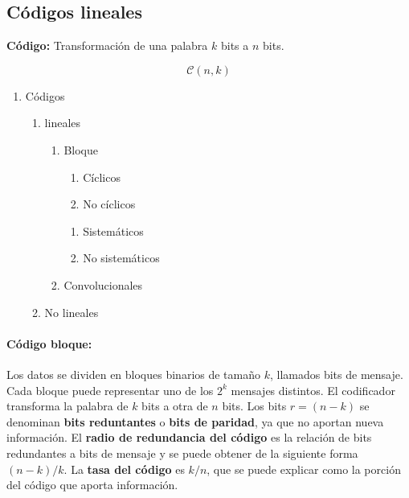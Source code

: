 \documentclass{article}
\begin{document}
\pagebreak
\subsection{Códigos lineales}

\textbf{Código:} Transformación de una palabra $k$ bits a $n$ bits.

\begin{equation}
    \mathcal{C}(n,k)
\end{equation}

\begin{enumerate}
    \item Códigos
    \begin{enumerate}
        \item lineales
        \begin{enumerate}
            \item Bloque
            \begin{enumerate}
                \item Cíclicos
                \item No cíclicos
            \end{enumerate}
            \begin{enumerate}
                \item Sistemáticos
                \item No sistemáticos
            \end{enumerate}
            \item Convolucionales
        \end{enumerate}
        \item No lineales
    \end{enumerate}
\end{enumerate}

\paragraph{Código bloque:} Los datos se dividen en bloques binarios de tamaño $k$, llamados bits de mensaje. Cada bloque puede representar uno de los $2^k$ mensajes distintos. El codificador transforma la palabra de $k$ bits a otra de $n$ bits. Los bits $r=(n-k)$ se denominan \textbf{bits reduntantes} o \textbf{bits de paridad}, ya que no aportan nueva información. El \textbf{radio de redundancia del código} es la relación de bits redundantes a bits de mensaje y se puede obtener de la siguiente forma $(n-k)/k$. La \textbf{tasa del código} es $k/n$, que se puede explicar como la porción del código que aporta información.
\end{document}
